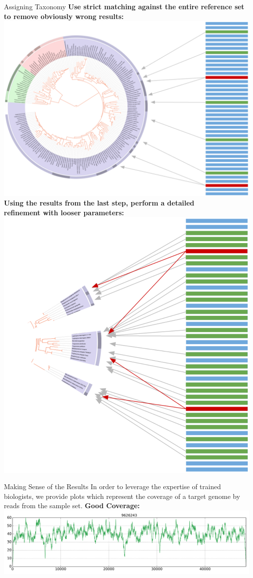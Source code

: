 \documentclass[final,t]{beamer}
\begin{document}
\begin{frame}{}
\begin{columns}[t]
\begin{column}{.3\linewidth}
        \begin{block}{Assigning Taxonomy}
            \textbf{Use strict matching against the entire reference set to remove obviously wrong results:}\\
            \includegraphics[width=.8\linewidth, right]{assets/Whole} \\
            \textbf{Using the results from the last step, perform a detailed\\ refinement with looser parameters:}\\
            \includegraphics[width=0.54\linewidth, right]{assets/Subset}
        \end{block}
        \begin{block}{Making Sense of the Results}
            In order to leverage the expertise of trained biologists, we provide plots which represent the coverage
            of a target genome by reads from the sample set.\newline\newline
        \textbf{Good Coverage:}\\
        \includegraphics[width=.95\linewidth, center]{assets/coverage_plot_good}\\

\end{block}
\end{column}
\end{columns}
\end{frame}
\end{document}
